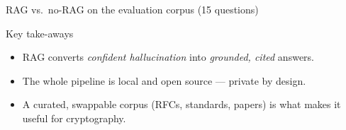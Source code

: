 \documentclass[aspectratio=169]{beamer}
\begin{document}
\begin{frame}{RAG vs.\ no-RAG on the evaluation corpus (15 questions)}
  \begin{center}
    \scriptsize
  \end{center}
  \vspace{2mm}
  \begin{block}{Key take-aways}
    \begin{itemize}
      \item RAG converts \emph{confident hallucination} into \emph{grounded,
        cited} answers.
      \item The whole pipeline is local and open source --- private by design.
      \item A curated, swappable corpus (RFCs, standards, papers) is what
        makes it useful for cryptography.
    \end{itemize}
  \end{block}
\end{frame}
\end{document}
